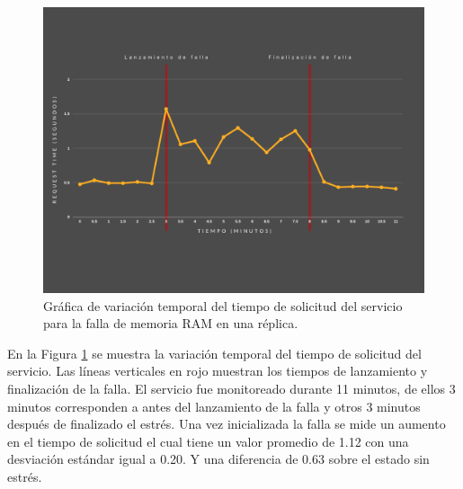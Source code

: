\begin{figure}[htpb!]
	\centering
	\includegraphics[width=0.95\columnwidth]{images/graficasexperimentos/RAM1.png}
	\caption{Gráfica de variación temporal del tiempo de solicitud del servicio para la falla de memoria RAM en una r\'eplica.}
	\label{fig:ram01}
\end{figure}


\par En la Figura \ref{fig:ram01} se muestra la variación temporal del tiempo de solicitud del servicio. Las líneas verticales en rojo muestran los tiempos de lanzamiento y finalización de la falla. El servicio fue monitoreado durante 11 minutos, de ellos 3 minutos corresponden a antes del lanzamiento de la falla y otros 3 minutos después de finalizado el estrés. Una vez inicializada la falla se mide un aumento en el tiempo de solicitud el cual tiene un valor promedio de 1.12 con una desviación estándar igual a 0.20. Y una diferencia de 0.63 sobre el estado sin estrés.\\

